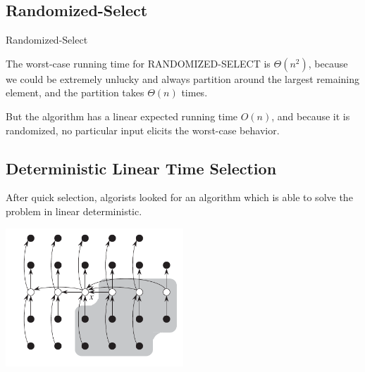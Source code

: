 \documentclass[en,hazy,blue,screen,14pt]{elegantnote}
\begin{document}
\subsection{Randomized-Select}
\begin{algorithm}[H]

 \caption{Randomized-Select}
\end{algorithm}
The worst-case running time for RANDOMIZED-SELECT is $\Theta(n^2)$, because we 
could be extremely unlucky and always partition around the largest remaining 
element, and the partition takes $\Theta(n)$ times.

But the algorithm has a linear expected running time $O(n)$, and because it is 
randomized, no particular input elicits the worst-case behavior.
\subsection{Deterministic Linear Time Selection}
After quick selection, algorists looked for an algorithm which is able to solve 
the problem in linear deterministic.

\centerline{\includegraphics[width=0.5\textwidth]{deterministic-select.png}}
\end{document}
